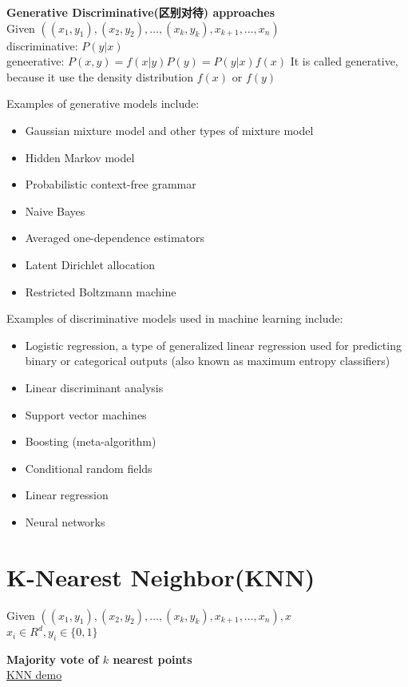\documentclass{article}
\begin{document}
\textbf{Generative Discriminative(区别对待) approaches}\\
Given $((x_1, y_1), (x_2, y_2), \ldots, (x_k, y_k), x_{k+1}, \ldots, x_n)$\\
discriminative: $P(y|x)$\\
geneerative: $P(x,y) = f(x|y)P(y) = P(y|x)f(x)$
It is called generative, because it use the density distribution $f(x)$ or $f(y)$

Examples of generative models include:
\begin{itemize}
\item Gaussian mixture model and other types of mixture model
\item Hidden Markov model
\item Probabilistic context-free grammar
\item Naive Bayes
\item Averaged one-dependence estimators
\item Latent Dirichlet allocation
\item Restricted Boltzmann machine
\end{itemize}

Examples of discriminative models used in machine learning include:
\begin{itemize}
\item Logistic regression, a type of generalized linear regression used for predicting binary or categorical outputs (also known as maximum entropy classifiers)
\item Linear discriminant analysis
\item Support vector machines
\item Boosting (meta-algorithm)
\item Conditional random fields
\item Linear regression
\item Neural networks
\end{itemize}

\section{K-Nearest Neighbor(KNN)}
Given $((x_1, y_1), (x_2, y_2), \ldots, (x_k, y_k), x_{k+1}, \ldots, x_n), x$\\
$x_i \in R^d, y_i \in \{0, 1\}$

\textbf{Majority vote of $k$ nearest points}\\
\href{http://upload.wikimedia.org/wikipedia/commons/thumb/e/e7/KnnClassification.svg/220px-KnnClassification.svg.png}{KNN demo}
\end{document}
